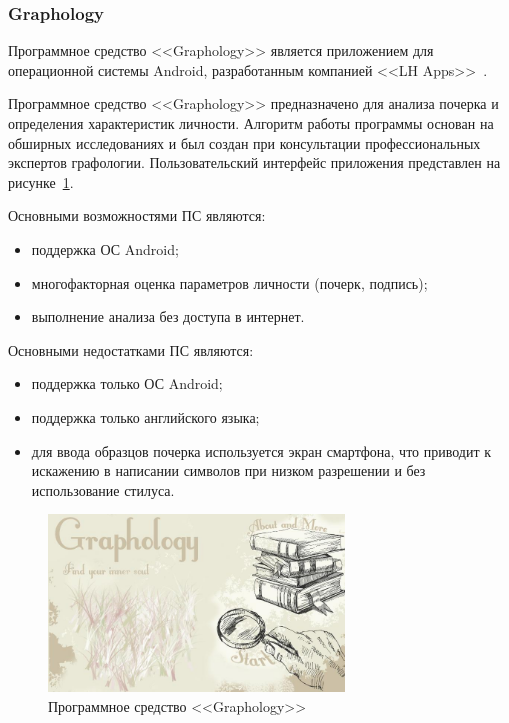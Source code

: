 \subsubsection{Graphology}
\label{sub:domain:analogs:graphology}
Программное средство <<Graphology>> является приложением для операционной системы Android, разработанным компанией <<LH Apps>>~\cite{analogs_graphology}.

Программное средство <<Graphology>> предназначено для анализа почерка и определения характеристик личности. Алгоритм работы программы основан на обширных исследованиях и был создан при консультации профессиональных экспертов графологии. Пользовательский интерфейс приложения представлен на рисунке~\ref{fig:domain:analogs:graphology}.

Основными возможностями ПС являются:
\begin{itemize}
  \item поддержка ОС Android;
  \item многофакторная оценка параметров личности (почерк, подпись);
  \item выполнение анализа без доступа в интернет.
\end{itemize}

Основными недостатками ПС являются:
\begin{itemize}
  \item поддержка только ОС Android;
  \item поддержка только английского языка;
  \item для ввода образцов почерка используется экран смартфона, что приводит к искажению в написании символов при низком разрешении и без использование стилуса.
\end{itemize}

\begin{figure}[ht]
    \centering
    \includegraphics[width=0.7\textwidth]{figures/graphology_analog.jpeg}
    \caption{Программное средство <<Graphology>>}
    \label{fig:domain:analogs:graphology}
\end{figure}

